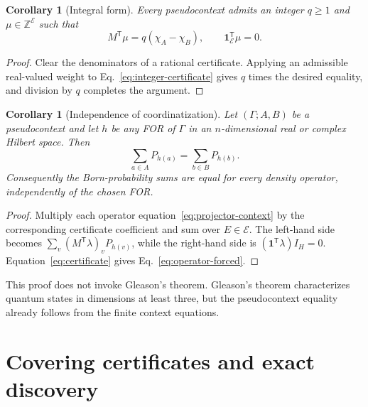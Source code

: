 \documentclass[
  twocolumn,
  aps,
  pra,
  floatfix,
  amsmath,amssymb,
  longbibliography
]{revtex4-2}
\newtheorem{corollary}[theorem]{Corollary}
\theoremstyle{definition}
\theoremstyle{remark}
\newcommand{\E}{\mathcal E}
\newcommand{\one}{\mathbf 1}
\begin{document}
\begin{corollary}[Integral form]
Every pseudocontext admits an integer $q\ge1$ and
$\mu\in\mathbb Z^{\E}$ such that
\begin{equation}
 M^{\mathsf T}\mu=q(\chi_A-\chi_B),
 \qquad \one_\E^{\mathsf T}\mu=0.
 \label{eq:integer-certificate}
\end{equation}
\end{corollary}

\begin{proof}
Clear the denominators of a rational certificate.  Applying an admissible
real-valued weight to Eq.~\eqref{eq:integer-certificate} gives $q$ times the
desired equality, and division by $q$ completes the argument.
\end{proof}

\begin{corollary}[Independence of coordinatization]
\label{cor:coordinates}
Let $(\Gamma;A,B)$ be a pseudocontext and let $h$ be any FOR of $\Gamma$
in an $n$-dimensional real or complex Hilbert
space.  Then
\begin{equation}
 \sum_{a\in A}P_{h(a)}=\sum_{b\in B}P_{h(b)}.
 \label{eq:operator-forced}
\end{equation}
Consequently the Born-probability sums are equal for every density operator,
independently of the chosen FOR.
\end{corollary}

\begin{proof}
Multiply each operator equation~\eqref{eq:projector-context} by the
corresponding certificate coefficient and sum over $E\in\E$.  The left-hand
side becomes
$\sum_v(M^{\mathsf T}\lambda)_vP_{h(v)}$, while the right-hand side is
$(\one^{\mathsf T}\lambda)I_H=0$.  Equation~\eqref{eq:certificate} gives
Eq.~\eqref{eq:operator-forced}.
\end{proof}

This proof does not invoke Gleason's theorem.  Gleason's theorem
\cite{Gleason} characterizes quantum states in dimensions at least three,
but the pseudocontext equality already follows from the finite context
equations.

\section{Covering certificates and exact discovery}
\label{sec:coverings}
\end{document}

